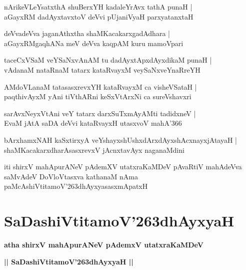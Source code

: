 \documentclass[twoside,12pt,openright]{book}
\def\S{\char'263}
\newcounter{shloka}[chapter]
\begin{document}
\begin{shloka}%
nArikeVLeYsatxthA shuBerxYH kadaleYrAvx tathA punaH |\\
aGayxRM dadAyxtavxtoV deVvi pUjaniVyaH parxyatanxtaH 
\end{shloka}

\begin{shloka}%
deVvadeVva jaganAthxtha shaMKacakarxgadAdhara |\\
aGayxRMgaqhANa meV deVva kaqpAM kuru mamoVpari
\end{shloka}

\begin{shloka}%
taceCxVSaM veYSaNxvAnAM tu dadAyxtApxdAyxdikaM punaH |\\
vAdanaM nataRnaM tatarx kataRvayxM veySaNxveYnaRreYH
\end{shloka}

\begin{shloka}%
AMdoVLanaM tatasasxrevxYH kataRvayxM ca visheVSataH |\\
paqthivAyxM yAni tiVthARni keSxVtArxNi ca sureVshavxri
\end{shloka}

\begin{shloka}%
sarAvxNeyxVtAni veY tatarx darxSuTxmAyAMti tadidxneV |\\
EvaM jAtA saDA deVvi kataRvayxH utasxvoV mahA\char'366
\end{shloka}

\begin{shloka}%
bArxhamxNAH kaSxtirxyA veYshayxshUshxdArxdAyxshAcxnayxjAtayaH |\\
shaMKacakarxdharAsasxrevxV jAcnxtavAyx naganaMdini
\end{shloka}

\begin{center}
iti shirxV mahApurANeV pAdemXV utatxraKaMDeV pAvaRtiV mahAdeVva saMvAdeV DoVloVtasxva kathanaM nAma 
paMcAshiVtitamoV\S dhAyxyasasxmApatxH 
\end{center}

\chapter{SaDashiVtitamoV\S dhAyxyaH}

\begin{center}
{\LARGE\bfseries atha shirxV mahApurANeV pAdemxV utatxraKaMDeV}
\end{center}

\begin{center}
{\LARGE\bfseries || SaDashiVtitamoV\S dhAyxyaH || }
\end{center}
\end{document}
